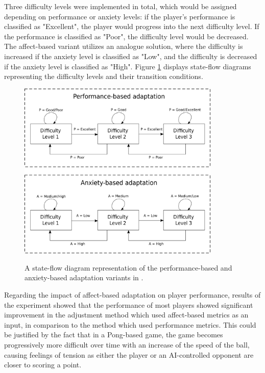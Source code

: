 Three difficulty levels were implemented in total, which would be assigned depending on performance or anxiety levels: if the player's performance is classified as "Excellent", the player would progress into the next difficulty level. If the performance is classified as "Poor", the difficulty level would be decreased. The affect-based variant utilizes an analogue solution, where the difficulty is increased if the anxiety level is classified as "Low", and the difficulty is decreased if the anxiety level is classified as "High". Figure \ref{fig:affective-adaptation} displays state-flow diagrams representing the difficulty levels and their transition conditions.

\begin{figure}[!h]
    \begin{center}
    \caption{A state-flow diagram representation of the performance-based and anxiety-based adaptation variants in \citet{article_affectivedda}.}
        \includegraphics[width=26em]{figures/fig-affective-adaptation.png}
        \label{fig:affective-adaptation}
    \end{center}
\end{figure}


Regarding the impact of affect-based adaptation on player performance, results of the experiment showed that the performance of most players showed significant improvement in the adjustment method which used affect-based metrics as an input, in comparison to the method which used performance metrics.  This could be justified by the fact that in a Pong-based game, the game becomes progressively more difficult over time with an increase of the speed of the ball, causing feelings of tension as either the player or an AI-controlled opponent are closer to scoring a point.

